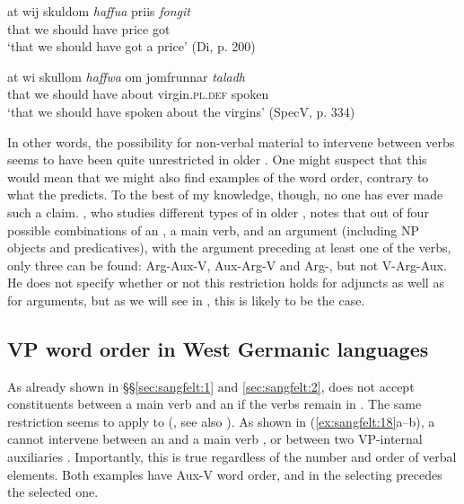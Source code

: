 \documentclass[output=paper, colorlinks, citecolor=brown]{langscibook}
\begin{document}
\ex\label{ex:sangfelt:17c}
\gll at wij skuldom \textit{haffua} {priis} \textit{fongit} \\
 that we should have price got\\
\glt ‘that we should have got a price' (Di, p. 200)

\ex\label{ex:sangfelt:17d}
\gll at wi skullom \textit{haffwa} {om} {jomfrunnar} \textit{taladh} \\
 that we should have about virgin.\textsc{pl.def} spoken\\
\glt ‘that we should have spoken about the virgins’ (SpecV, p. 334)
\z 
\z 

In other words, the possibility for non-verbal material to intervene between verbs seems to have been quite unrestricted in older . One might suspect that this would mean that we might also find examples of the  word order, contrary to what the  predicts. To the best of my knowledge, though, no one has ever made such a claim. \citet[155, 158–160]{Petzell2011}, who studies different types of  in older , notes that out of four possible combinations of an , a main verb, and an argument (including NP objects and predicatives), with the argument preceding at least one of the verbs, only three can be found: Arg-Aux-V, Aux-Arg-V and Arg-, but not V-Arg-Aux. He does not specify whether or not this restriction holds for adjuncts as well as for arguments, but as we will see in , this is likely to be the case.

\subsection{VP word order in West Germanic languages}\label{sec:sangfelt:3.3}

As already shown in §§\ref{sec:sangfelt:1} and \ref{sec:sangfelt:2},  does not accept constituents between a main verb and an  if the verbs remain in . The same restriction seems to apply to  (\citealt[290--291]{Haider2010}, see also \citealt{Wurmbrand2004}). As shown in (\ref{ex:sangfelt:18}a–b), a  cannot intervene between an  and a main verb , or between two VP-internal auxiliaries . Importantly, this is true regardless of the number and order of verbal elements. Both examples have Aux-V word order, and in  the selecting  precedes the selected one.
\end{document}
